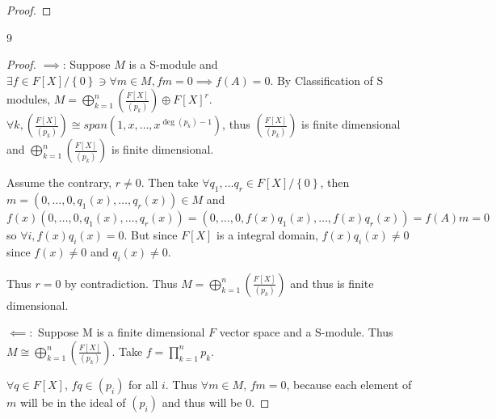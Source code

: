 \documentclass{article}
\begin{document}
\begin{proof}
    
    

    
    
    
\end{proof}

\bigskip

\begin{PROB}{9}\label{Problem 9.}
\end{PROB}
\begin{proof}
    $\implies$: Suppose $M$ is a S-module and $\exists f \in F[X]/\left\{ 0 \right\} \ni \forall m \in M, fm = 0 \implies f(A) = 0$. By Classification of S modules, $M = \bigoplus_{k = 1}^n \left(\frac{F[X]}{\left(p_k\right)}\right) \oplus F[X]^r$. $\forall k, \left(\frac{F[X]}{\left(p_k\right)}\right) \cong span(1, x, \dots, x^{\deg(p_k) - 1})$, thus $\left(\frac{F[X]}{\left(p_k\right)}\right)$ is finite dimensional and  $\bigoplus_{k = 1}^n \left(\frac{F[X]}{\left(p_k\right)}\right)$ is finite dimensional. 
    
    
    Assume the contrary, $r \neq 0$. Then take $\forall q_1, \dots q_r \in F[X]/\left\{ 0 \right\}$, then $m = (0, \dots, 0, q_1(x), \dots, q_r(x)) \in M$ and $f(x)(0, \dots, 0, q_1(x), \dots, q_r(x)) = (0, \dots, 0, f(x)q_1(x), \dots, f(x)q_r(x)) = f(A)m = 0$ so $\forall i, f(x)q_i(x) = 0$. But since $F[X]$ is a integral domain, $f(x)q_i(x) \neq 0$ since $f(x) \neq 0$ and $q_i(x) \neq 0 $. 

    Thus $r = 0$ by contradiction. Thus $M = \bigoplus_{k = 1}^n \left(\frac{F[X]}{\left(p_k\right)}\right)$ and thus is finite dimensional.
    
    
    $\impliedby:$ Suppose M is a finite dimensional $F$ vector space and a S-module. Thus $M \cong \bigoplus_{k = 1}^n \left(\frac{F[X]}{\left(p_k\right)}\right)$. Take $f = \prod_{k = 1}^{n}p_k$. 
    
    $\forall q \in F[X]$, $fq \in (p_i)$ for all $i$. Thus $\forall m \in M$, $fm = 0$, because each element of $m$ will be in the ideal of $(p_i)$ and thus will be 0.        
\end{proof}
\end{document}
